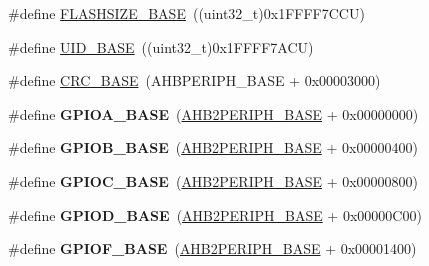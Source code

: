 \begin{DoxyCompactItemize}
\item 
\#define \hyperlink{group___peripheral__memory__map_ga776d985f2d4d40b588ef6ca9d573af78}{F\+L\+A\+S\+H\+S\+I\+Z\+E\+\_\+\+B\+A\+SE}~((uint32\+\_\+t)0x1\+F\+F\+F\+F7\+C\+C\+U)
\item 
\#define \hyperlink{group___peripheral__memory__map_ga664eda42b83c919b153b07b23348be67}{U\+I\+D\+\_\+\+B\+A\+SE}~((uint32\+\_\+t)0x1\+F\+F\+F\+F7\+A\+C\+U)
\item 
\#define \hyperlink{group___peripheral__memory__map_ga656a447589e785594cbf2f45c835ad7e}{C\+R\+C\+\_\+\+B\+A\+SE}~(A\+H\+B\+P\+E\+R\+I\+P\+H\+\_\+\+B\+A\+SE + 0x00003000)
\item 
\mbox{\label{group___peripheral__memory__map_gad7723846cc5db8e43a44d78cf21f6efa}} 
\#define {\bfseries G\+P\+I\+O\+A\+\_\+\+B\+A\+SE}~(\hyperlink{group___peripheral__memory__map_gaeedaa71d22a1948492365e2cd26cfd46}{A\+H\+B2\+P\+E\+R\+I\+P\+H\+\_\+\+B\+A\+SE} + 0x00000000)
\item 
\mbox{\label{group___peripheral__memory__map_gac944a89eb789000ece920c0f89cb6a68}} 
\#define {\bfseries G\+P\+I\+O\+B\+\_\+\+B\+A\+SE}~(\hyperlink{group___peripheral__memory__map_gaeedaa71d22a1948492365e2cd26cfd46}{A\+H\+B2\+P\+E\+R\+I\+P\+H\+\_\+\+B\+A\+SE} + 0x00000400)
\item 
\mbox{\label{group___peripheral__memory__map_ga26f267dc35338eef219544c51f1e6b3f}} 
\#define {\bfseries G\+P\+I\+O\+C\+\_\+\+B\+A\+SE}~(\hyperlink{group___peripheral__memory__map_gaeedaa71d22a1948492365e2cd26cfd46}{A\+H\+B2\+P\+E\+R\+I\+P\+H\+\_\+\+B\+A\+SE} + 0x00000800)
\item 
\mbox{\label{group___peripheral__memory__map_ga1a93ab27129f04064089616910c296ec}} 
\#define {\bfseries G\+P\+I\+O\+D\+\_\+\+B\+A\+SE}~(\hyperlink{group___peripheral__memory__map_gaeedaa71d22a1948492365e2cd26cfd46}{A\+H\+B2\+P\+E\+R\+I\+P\+H\+\_\+\+B\+A\+SE} + 0x00000\+C00)
\item 
\mbox{\label{group___peripheral__memory__map_ga7f9a3f4223a1a784af464a114978d26e}} 
\#define {\bfseries G\+P\+I\+O\+F\+\_\+\+B\+A\+SE}~(\hyperlink{group___peripheral__memory__map_gaeedaa71d22a1948492365e2cd26cfd46}{A\+H\+B2\+P\+E\+R\+I\+P\+H\+\_\+\+B\+A\+SE} + 0x00001400)

\end{DoxyCompactItemize}
